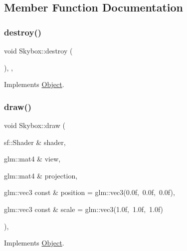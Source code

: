 \subsection{Member Function Documentation}
\mbox{\label{classSkybox_a8a93bcf913a1aae88a9a4aa3d20abacc}} 
\subsubsection{\texorpdfstring{destroy()}{destroy()}}
{\footnotesize\ttfamily void Skybox\+::destroy (\begin{DoxyParamCaption}{ }\end{DoxyParamCaption})\hspace{0.3cm}{\ttfamily [override]}, {\ttfamily [protected]}, {\ttfamily [virtual]}}



Implements \hyperlink{classObject_a69e91bef2c9f048aa4509329dc44948e}{Object}.

\mbox{\label{classSkybox_a6263a420c7ec39e284342988679d3807}} 
\subsubsection{\texorpdfstring{draw()}{draw()}}
{\footnotesize\ttfamily void Skybox\+::draw (\begin{DoxyParamCaption}\item[{sf\+::\+Shader \&}]{shader,  }\item[{glm\+::mat4 \&}]{view,  }\item[{glm\+::mat4 \&}]{projection,  }\item[{glm\+::vec3 const \&}]{position = {\ttfamily glm\+:\+:vec3(0.0f,~0.0f,~0.0f)},  }\item[{glm\+::vec3 const \&}]{scale = {\ttfamily glm\+:\+:vec3(1.0f,~1.0f,~1.0f)} }\end{DoxyParamCaption})\hspace{0.3cm}{\ttfamily [override]}, {\ttfamily [virtual]}}



Implements \hyperlink{classObject_ab1ec4e4c64ac1564d9ccad7655cfaf82}{Object}.

\mbox{\label{classSkybox_a0184f32862c7c46efcce78bde9ee9836}} 
